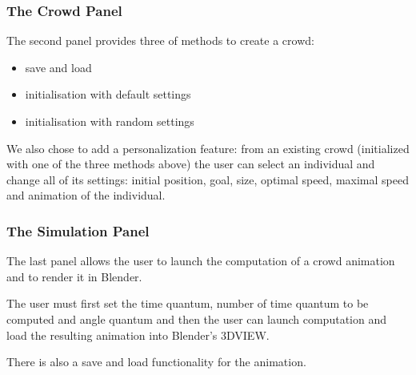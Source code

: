 \subsubsection{The Crowd Panel} 

The second panel provides three of methods to create a crowd:
\begin{itemize}
\item save and load
\item initialisation with default settings
\item initialisation with random settings
\end{itemize}

We also chose to add a personalization feature: from an existing crowd
(initialized with one of the three methods above) the user can select
an individual and change all of its settings: initial position, goal,
size, optimal speed, maximal speed and animation of the individual.


\subsubsection{The Simulation Panel} 

The last panel allows the user to launch the computation of a crowd
animation and to render it in Blender.

The user must first set the time quantum, number of time quantum to be
computed and angle quantum and then the user can launch
computation and load the resulting animation into Blender's 3DVIEW.


There is also a save and load functionality for the animation.

